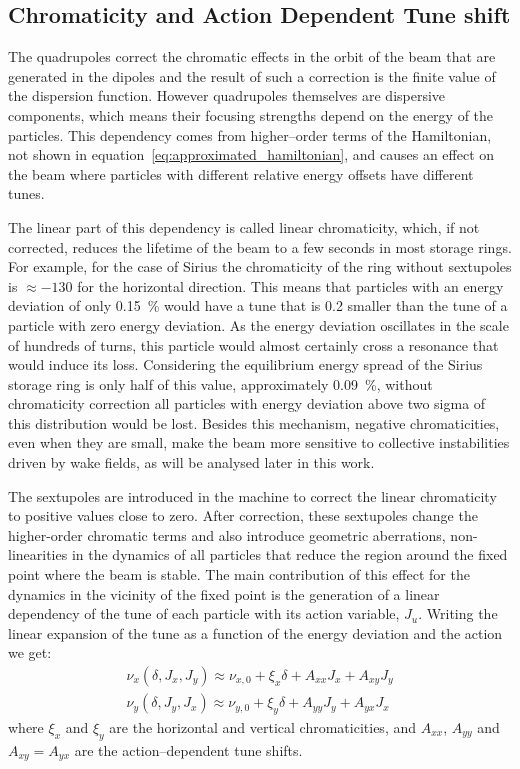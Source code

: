 \subsection{Chromaticity and Action Dependent Tune shift}\label{sec:chromaticity}

	The quadrupoles correct the chromatic effects in the orbit of the beam that are generated in the dipoles and the result of such a correction is the finite value of the dispersion function. However quadrupoles themselves are dispersive components, which means their focusing strengths depend on the energy of the particles. This dependency comes from higher--order terms of the Hamiltonian, not shown in equation~\eqref{eq:approximated_hamiltonian}, and causes an effect on the beam where particles with different relative energy offsets have different tunes.

    The linear part of this dependency is called linear chromaticity, which, if not corrected, reduces the lifetime of the beam to a few seconds in most storage rings. For example, for the case of Sirius the chromaticity of the ring without sextupoles is $\approx -130$ for the horizontal direction. This means that particles with an energy deviation of only \SI{0.15}{\percent} would have a tune that is \SI{0.2}{} smaller than the tune of a particle with zero energy deviation. As the energy deviation oscillates in the scale of hundreds of turns, this particle would almost certainly cross a resonance that would induce its loss. Considering the equilibrium energy spread of the Sirius storage ring is only half of this value, approximately \SI{0.09}{\percent}, without chromaticity correction all particles with energy deviation above two sigma of this distribution would be lost. Besides this mechanism, negative chromaticities, even when they are small, make the beam more sensitive to collective instabilities driven by wake fields, as will be analysed later in this work.

	The sextupoles are introduced in the machine to correct the linear chromaticity to positive values close to zero. After correction, these sextupoles change the higher-order chromatic terms and also introduce geometric aberrations, non-linearities in the dynamics of all particles that reduce the region around the fixed point where the beam is stable. The main contribution of this effect for the dynamics in the vicinity of the fixed point is the generation of a linear dependency of the tune of each particle with its action variable, $J_u$. Writing the linear expansion of the tune as a function of the energy deviation and the action we get:
	\begin{align}
		\nu_x(\delta, J_x, J_y) \approx \nu_{x,0} + \xi_x \delta + A_{xx} J_x + A_{xy} J_y \\\nonumber
		\nu_y(\delta, J_y, J_x) \approx \nu_{y,0} + \xi_y \delta + A_{yy} J_y + A_{yx} J_x
	\end{align}
	where $\xi_x$ and $\xi_y$ are the horizontal and vertical chromaticities, and $A_{xx}$, $A_{yy}$ and $A_{xy}=A_{yx}$ are the action--dependent tune shifts.

